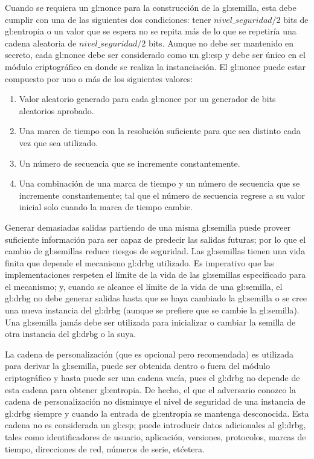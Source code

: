 Cuando se requiera un \gls{gl:nonce} para la construcción de la
\gls{gl:semilla}, esta debe cumplir con una de las siguientes dos condiciones:
tener $nivel\_seguridad/2$ bits de \gls{gl:entropia} o un valor que se espera
no se repita más de lo que se repetiría una cadena aleatoria de
$nivel\_seguridad/2$ bits. Aunque no debe ser mantenido en secreto, cada
\gls{gl:nonce} debe ser considerado como un \gls{gl:csp} y debe ser único en
el módulo criptográfico en donde se realiza la instanciación. El \gls{gl:nonce}
puede estar compuesto por uno o más de los siguientes valores:
\begin{enumerate}
    \item Valor aleatorio generado para cada \gls{gl:nonce} por un generador
        de bits aleatorios aprobado.
    \item Una marca de tiempo con la resolución suficiente para que sea distinto
        cada vez que sea utilizado.
    \item Un número de secuencia que se incremente constantemente.
    \item Una combinación de una marca de tiempo y un número de secuencia que se
        incremente constantemente; tal que el número de secuencia regrese a su
        valor inicial solo cuando la marca de tiempo cambie.
\end{enumerate}

Generar demasiadas salidas partiendo de una misma \gls{gl:semilla} puede proveer
suficiente información para ser capaz de predecir las salidas futuras; por lo
que el cambio de \glspl{gl:semilla} reduce riesgos de seguridad. Las
\glspl{gl:semilla} tienen una vida finita que depende el mecanismo \gls{gl:drbg}
utilizado. Es imperativo que las implementaciones respeten el límite de la vida
de las \glspl{gl:semilla} especificado para el mecanismo; y, cuando se alcance
el límite de la vida de una \gls{gl:semilla}, el \gls{gl:drbg} no debe generar
salidas hasta que se haya cambiado la \gls{gl:semilla} o se cree una nueva
instancia del \gls{gl:drbg} (aunque se prefiere que se cambie la
\gls{gl:semilla}). Una \gls{gl:semilla} jamás debe ser utilizada para
inicializar o cambiar la semilla de otra instancia del \gls{gl:drbg} o la suya.

La cadena de personalización (que es opcional pero recomendada) es utilizada
para derivar la \gls{gl:semilla}, puede ser obtenida dentro o fuera del
módulo criptográfico y hasta puede ser una cadena vacía, pues el \gls{gl:drbg}
no depende de esta cadena para obtener \gls{gl:entropia}. De hecho, el que
el adversario conozco la cadena de personalización no disminuye el nivel de
seguridad de una instancia de \gls{gl:drbg} siempre y cuando la entrada de
\gls{gl:entropia} se mantenga desconocida. Esta cadena no es considerada un
\gls{gl:csp}; puede introducir datos adicionales al \gls{gl:drbg}, tales como
identificadores de usuario, aplicación, versiones, protocolos, marcas de tiempo,
direcciones de red, números de serie, etćetera.


